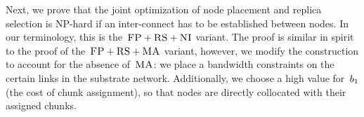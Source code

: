 
Next, we prove that the joint optimization of node placement and replica selection
is NP-hard if an inter-connect has to be established between nodes.
In our terminology, this is the~$\textsc{FP}+\textsc{RS}+\textsc{NI}$ variant.
The proof is similar in spirit to the proof of the~$\textsc{FP}+\textsc{RS}+\textsc{MA}$ variant, however,
we modify the construction to account for the absence of~$\textsc{MA}$:
we place a bandwidth constraints on the certain links in the substrate network.
Additionally, we choose
a high value for~$b_1$ (the cost of chunk assignment), so that nodes are directly collocated with
their assigned chunks.

